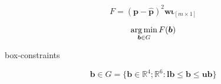 \begin{equation}\label{eq:objfct-nelson}
	F=\left(\bm{p} - \bm{\hat{p}}\right)^2 \bm{w}\bm{\iota}_{\left[m \times 1\right]}
\end{equation}

\begin{equation}
  \label{eq:objfct-nelsonmin}
  \operatorname*{arg\,min}_{\bm{b} \in G} F(\bm{b})
\end{equation}

box-constraints

	
	 $$ \bm{b} \in G =   \{ \bm{b} \in \mathbb{R}^4 ; \mathbb{R}^6 : \mathbf{lb} \leq \bm{b} \leq \mathbf{ub}  \}$$



